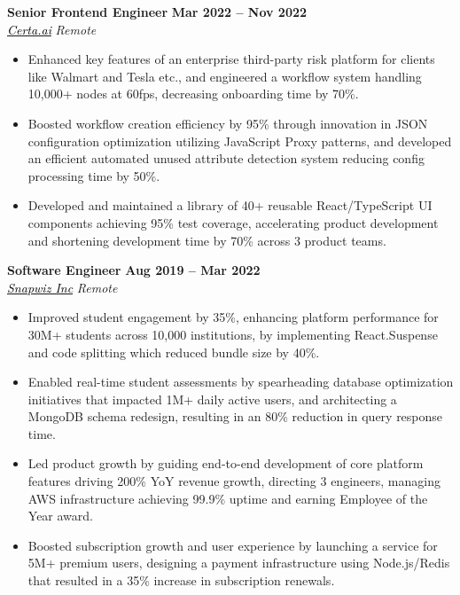 \documentclass[10pt,letterpaper]{article}
\begin{document}
\vspace{1mm}
\hspace{0in}\textbf{Senior Frontend Engineer} \hfill \textbf{Mar 2022 -- Nov 2022}\\
\hspace{0in}\textit{\href{https://certa.ai}{\textcolor{black}{Certa.ai}}} \hfill \textit{Remote} %
\begin{itemize}[leftmargin=0.15in,nosep,topsep=3pt,itemsep=1mm]
   \item Enhanced key features of an enterprise third-party risk platform for clients like Walmart and Tesla etc., and engineered a workflow system handling 10,000+ nodes at 60fps, decreasing onboarding time by 70\%.
     \item Boosted workflow creation efficiency by 95\% through innovation in JSON configuration optimization utilizing JavaScript Proxy patterns, and developed an efficient automated unused attribute detection system reducing config processing time by 50\%.
   \item Developed and maintained a library of 40+ reusable React/TypeScript UI components achieving 95\% test coverage, accelerating product development and shortening development time by 70\% across 3 product teams.
\end{itemize}

\vspace{1mm}
\hspace{0in}\textbf{Software Engineer} \hfill \textbf{Aug 2019 -- Mar 2022}\\
\hspace{0in}\textit{\href{https://edulastic.com}{\textcolor{black}{Snapwiz Inc}}} \hfill \textit{Remote} %
\begin{itemize}[leftmargin=0.15in,nosep,topsep=3pt,itemsep=1mm]
   \item Improved student engagement by 35\%, enhancing platform performance for 30M+ students across 10,000 institutions, by implementing React.Suspense and code splitting which reduced bundle size by 40\%.
 \item Enabled real-time student assessments by spearheading database optimization initiatives that impacted 1M+ daily active users, and architecting a MongoDB schema redesign, resulting in an 80\% reduction in query response time.
 \item Led product growth by guiding end-to-end development of core platform features driving 200\% YoY revenue growth, directing 3 engineers, managing AWS infrastructure achieving 99.9\% uptime and earning Employee of the Year award.
 \item Boosted subscription growth and user experience by launching a service for 5M+ premium users, designing a payment infrastructure using Node.js/Redis that resulted in a 35\% increase in subscription renewals.
\end{itemize}
\end{document}
